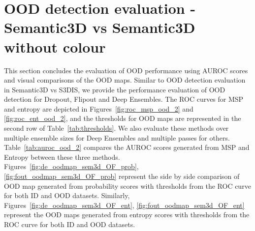     \section{OOD detection evaluation -  Semantic3D vs Semantic3D without colour}
    This section concludes the evaluation of OOD performance using AUROC scores and visual comparisons of the OOD maps.
    Similar to OOD detection evaluation in Semantic3D vs S3DIS, we provide the performance evaluation of OOD detection for Dropout, Flipout and Deep Ensembles.
    The ROC curves for MSP and entropy are depicted in Figures~\ref{fig:roc_msp_ood_2} and \ref{fig:roc_ent_ood_2}, and the thresholds for OOD maps are represented in the second row of Table~\ref{tab:thresholds}.
    We also evaluate these methods over multiple ensemble sizes for Deep Ensembles and multiple passes for others.
    Table~\ref{tab:auroc_ood_2} compares the AUROC scores generated from MSP and Entropy between these three methods.
    Figures~\ref{fig:de_oodmap_sem3d_OF_prob}, \ref{fig:fout_oodmap_sem3d_OF_prob} represent the side by side comparison of OOD map generated from probability scores with thresholds from the ROC curve for both ID and OOD datasets.
    Similarly, Figures~\ref{fig:de_oodmap_sem3d_OF_ent}, \ref{fig:fout_oodmap_sem3d_OF_ent} represent the OOD maps generated from entropy scores with thresholds from the ROC curve for both ID and OOD datasets.

